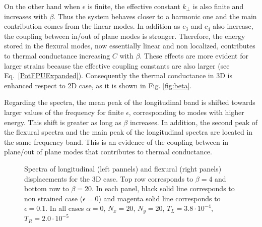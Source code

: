 \documentclass[12pt]{article}
\begin{document}
On the other hand when $\epsilon$ is finite, the effective constant $k_{\perp}$ is also finite and increases with $\beta$. Thus the system behaves closer to a harmonic one and the main contribution comes from the linear modes.  In addition as $c_3$ and $c_4$ also increase, the coupling between in/out of plane modes is stronger. Therefore, the energy stored in the flexural modes, now essentially linear and non localized, contributes to thermal conductance increasing $C$ with $\beta$. These effects are more evident for larger strains because the effective coupling constants are also larger (see Eq.~\ref{PotFPUExpanded}). Consequently the thermal conductance in 3D is enhanced respect to 2D case, as it is shown in Fig. \ref{fig:beta}.

Regarding the spectra, the mean peak of the longitudinal band is shifted towards larger values of the frequency for finite $\epsilon$, corresponding to modes with higher energy. This shift is greater as long as $\beta$ increases. In addition, the second peak of the flexural spectra and the main peak of the longitudinal spectra are located in the same frequency band. This is an evidence of the coupling between in plane/out of plane modes that contributes to thermal conductance.


\begin{figure}[H]
\begin{minipage}{0.5\textwidth}
\end{minipage}%
\hfill
\begin{minipage}{0.5\textwidth}
\end{minipage}%
\vfill
\begin{minipage}{0.5\textwidth}
\end{minipage}%
\hfill
\begin{minipage}{0.5\textwidth}
\end{minipage}%
\vfill
\caption{Spectra of longitudinal (left pannels) and flexural (right panels) displacements for the 3D case. Top row corresponds to $\beta=4$ and bottom row to $\beta=20$. In each panel, black solid line corresponds to non strained case ($\epsilon=0$) and magenta solid line corresponds to $\epsilon=0.1$. In all cases $\alpha = 0$,  $N_x =20$, $N_y =20$, $T_{L}=3.8\cdot 10^{-4}$, $T_{R}=2.0\cdot 10^{-5}$ }
\label{fig:spectraB}
\end{figure}
\end{document}
